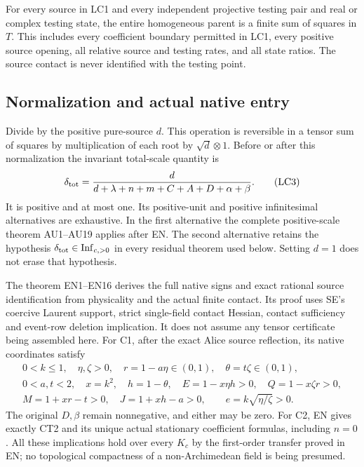 \begin{theorem}
For every source in LC1 and every independent projective testing pair
and real or complex testing state, the entire homogeneous parent is
a finite sum of squares in \(T\).
This includes every coefficient boundary permitted in LC1, every
positive source opening, all relative source and testing rates, and
all state ratios.  The source contact is never identified with the
testing point.
\end{theorem}

\subsection{Normalization and actual native entry}

Divide by the positive pure-source \(d\).  This operation is reversible
in a tensor sum of squares by multiplication of each root by
\(\sqrt d\otimes1\).  Before or after this normalization the invariant
total-scale quantity is
\[
 \delta_{\rm tot}
  =\frac d{d+\lambda+n+m+C+A+D+\alpha+\beta}.
\tag{LC3}
\]
It is positive and at most one.  Its positive-unit and positive
infinitesimal alternatives are exhaustive.  In the first alternative
the complete positive-scale theorem AU1--AU19 applies after EN.
The second alternative retains the hypothesis
\(\delta_{\rm tot}\in\mathrm{Inf}_{c,>0}\) in every residual theorem
used below.  Setting \(d=1\) does not erase that hypothesis.

The theorem EN1--EN16 derives the full native signs and exact rational
source identification from physicality and the actual finite contact.
Its proof uses SE's coercive Laurent support, strict single-field
contact Hessian, contact sufficiency and event-row deletion implication.
It does not assume any tensor certificate being assembled here.
For C1, after the exact Alice source reflection, its native coordinates
satisfy
\[
\begin{gathered}
 0<k\leq1,\quad \eta,\zeta>0,\quad
 r=1-a\eta\in(0,1),\quad \theta=t\zeta\in(0,1),\\
 0<a,t<2,\quad x=k^2,\quad h=1-\theta,\quad
 E=1-x\eta h>0,\quad Q=1-x\zeta r>0,\\
 M=1+xr-t>0,\quad J=1+xh-a>0,\qquad
 e=k\sqrt{\eta/\zeta}>0 .
\end{gathered}\tag{LC4}
\]
The original \(D,\beta\) remain nonnegative, and either may be zero.
For C2, EN gives exactly CT2 and its unique actual stationary
coefficient formulas, including \(n=0\).
All these implications hold over every \(K_c\) by the first-order
transfer proved in EN; no topological compactness of a
non-Archimedean field is being presumed.

